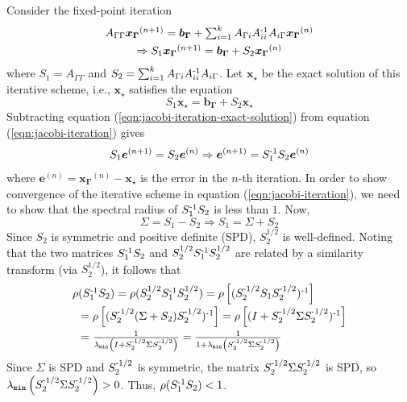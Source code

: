 Consider the fixed-point iteration
\begin{equation}
\label{eqn:jacobi-iteration}
\begin{array}{c}
A_{\Gamma\Gamma}\boldsymbol{x_\Gamma}^{(n+1)}=\boldsymbol{b_\Gamma}+\sum_{i=1}^k A_{\Gamma i}A_{ii}^\varA{-1}A_{i \Gamma}\boldsymbol{x_\Gamma}^{(n)} \vspace*{.05in}\\
\Rightarrow S_1\boldsymbol{x_\Gamma}^{(n+1)}=\boldsymbol{b_\Gamma}+S_2\boldsymbol{x_\Gamma}^{(n)}
\end{array}
\end{equation}
where $S_1=A_{\Gamma\Gamma}$ and $S_2=\sum_{i=1}^k A_{\Gamma i}A_{ii}^{\operatorname{-1}}A_{i \Gamma}$. Let $\boldsymbol{x_\star}$ be the exact solution
of this iterative scheme, i.e., $\boldsymbol{x_\star}$ satisfies the
equation
\begin{equation}
\label{eqn:jacobi-iteration-exact-solution}
S_1\boldsymbol{x_\star}=\boldsymbol{b_\Gamma}+S_2\boldsymbol{x_\star}
\end{equation}
Subtracting equation (\ref{eqn:jacobi-iteration-exact-solution}) from equation
(\ref{eqn:jacobi-iteration}) gives
$$
\label{eqn:jacobi-iteration-error}
S_1\boldsymbol{e}^{(n+1)}=S_2\boldsymbol{e}^{(n)} \Rightarrow \boldsymbol{e}^{(n+1)}=S_1^{\operatorname{-1}}S_2\boldsymbol{e}^{(n)}
$$
where $\boldsymbol{e}^{(n)}=\boldsymbol{x_\Gamma}^{(n)}-\boldsymbol{x_\star}$ is the error in the $n$-th iteration.
In order to show convergence of the iterative scheme in equation
(\ref{eqn:jacobi-iteration}), we need to show that the spectral radius of $S_1^{\operatorname{-1}}S_2$ is less than $1$.
Now,
$$
\Sigma=S_1-S_2 \Rightarrow S_1=\Sigma+S_2
$$
Since $S_2$ is symmetric and positive definite (SPD), $S_2^{1/2}$ is well-defined.
Noting that the two matrices $S_1^{\operatorname{-1}}S_2$ and
$S_2^{1/2}S_1^{\operatorname{-1}}S_2^{1/2}$ are related by a similarity transform (via
$S_2^{1/2}$), it follows that
$$
\begin{array}{l}
\rho(S_1^\varA{-1}S_2) = \rho(S_2^{1/2}S_1^\varA{-1}S_2^{1/2})=\rho\left[(S_2^\varA{-1/2}S_1S_2^\varA{-1/2})^\varA{-1}\right]  \vspace*{.03in} \\
\hspace*{.1in}= \rho\left[(S_2^\varA{-1/2}(\Sigma+S_2)S_2^\varA{-1/2})^\varA{-1}\right] = \rho\left[(I+S_2^\varA{-1/2}\Sigma S_2^\varA{-1/2})^\varA{-1}\right] \vspace*{.05in}  \\
\hspace*{.1in}= \frac{1}{\lambda_\texttt{min}\left(I+S_2^\varA{-1/2}\Sigma S_2^\varA{-1/2}\right)} = \frac{1}{1+\lambda_\texttt{min}\left(S_2^\varA{-1/2}\Sigma S_2^\varA{-1/2}\right)}
\end{array}
$$
Since $\Sigma$ is SPD and $S_2^{\operatorname{-1/2}}$ is symmetric, the matrix
$S_2^{\operatorname{-1/2}}\Sigma S_2^{\operatorname{-1/2}}$ is SPD, so $\lambda_\texttt{min}\left(S_2^{\operatorname{-1/2}}\Sigma S_2^{\operatorname{-1/2}}\right)>0$.
Thus, $\rho(S_1^{\operatorname{-1}}S_2)<1$.


